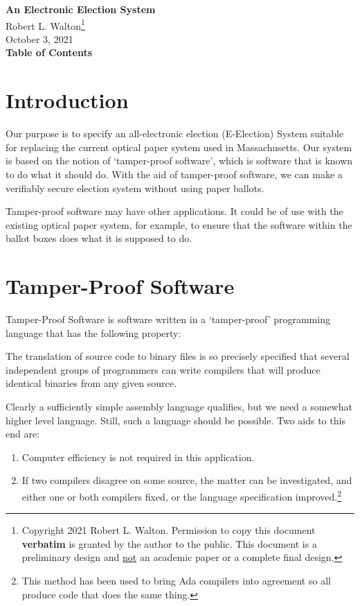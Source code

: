 \documentclass[12pt]{article}
\makeatletter
\renewcommand\tableofcontents{%
    \begin{list}{}%
	     {\setlength{\itemsep}{0in}%
	      \setlength{\topsep}{0in}%
	      \setlength{\parsep}{1ex}%
	      \setlength{\labelwidth}{0in}%
	      \setlength{\baselineskip}{1.5ex}%
	      \setlength{\leftmargin}{0.8in}%
	      \setlength{\rightmargin}{0.8in}}%
    \item\@starttoc{toc}%
    \end{list}}
\newenvironment{indpar}[1][0.3in]%
	{\begin{list}{}%
		     {\setlength{\itemsep}{0in}%
		      \setlength{\topsep}{0in}%
		      \setlength{\parsep}{1ex}%
		      \setlength{\labelwidth}{#1}%
		      \setlength{\leftmargin}{#1}%
		      \addtolength{\leftmargin}{\labelsep}}%
	 \item}%
	{\end{list}}
\makeatother
\begin{document}
        
\begin{center}
\Large
{\LARGE  \bf An Electronic Election System}
\\[2ex]
Robert L. Walton\footnote{Copyright 2021 Robert L. Walton.
Permission to copy this document {\bf verbatim} is granted by the author
to the public. This document is a preliminary design and
\underline{not} an academic paper or a complete final
design.}
\\[2ex]
October 3, 2021
\\[2ex]
{\bf Table of Contents}
\end{center}

\bigskip

\tableofcontents 

\newpage

\section{Introduction}

Our purpose is to specify an all-electronic election (E-Election) System
suitable for replacing the current optical paper system
used in Massachusetts.  Our system is based on the notion
of `tamper-proof software', which is software that is
known to do what it should do.  With the aid of tamper-proof
software, we can make a verifiably secure election system without
using paper ballots.

Tamper-proof software may have other applications.
It could be of use with the existing optical paper system,
for example, to ensure that the software within the ballot
boxes does what it is supposed to do.

\section{Tamper-Proof Software}

Tamper-Proof Software is software written in a `tamper-proof'
programming language
that has the following property:
\begin{indpar}
The translation of source code to binary files is so precisely
specified that several independent groups of programmers can
write compilers that will produce identical binaries from any
given source.
\end{indpar}

Clearly a sufficiently simple assembly language qualifies, but
we need a somewhat higher level language.  Still, such a language
should be possible.  Two aids to this end are:
\begin{enumerate}
\item
Computer efficiency is not required in this application.

\item
If two compilers disagree on some source, the matter can be
investigated, and either one or both compilers fixed, or the
language specification improved.\footnote{This method has been
used to bring Ada compilers into agreement so all produce
code that does the same thing.}
\end{enumerate}
\end{document}
